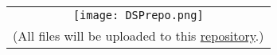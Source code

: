 \documentclass[UTF8,scheme=plain,linespread=1.3,zihao=-4,fontset=adobe,twoside]{ctexart}
\begin{document}
    \begingroup
    \tableofcontents
    \endgroup
    \cleardoublepage


    \setcounter{page}{1} 

    

    

    \vspace{\fill}
    \hfill
    \begin{tabular}{c}
        \texttt{[image: DSPrepo.png]} \\
        \scriptsize (All files will be uploaded to this \href{https://github.com/iChunyu/signal-process-demo}{repository}.)
    \end{tabular}

    \cleardoublepage
    \appendix

    
\end{document}
